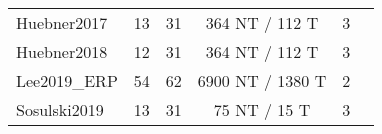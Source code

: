 \documentclass[twocolumn]{article}
\begin{document}
\begin{table*}[h]
\begin{tabularx}{\linewidth}{@{}Xrrcrl@{}}
		Huebner2017    & 13                         & 31          & 364 NT / 112 T           & 3                          &                                          \\
		Huebner2018    & 12                         & 31          & 364 NT / 112 T           & 3                          &                                          \\
		Lee2019\_ERP   & 54                         & 62          & 6900 NT / 1380 T         & 2                          &                                          \\
		Sosulski2019   & 13                         & 31          & 75 NT / 15 T             & 3                          &                                          \\ \bottomrule
	\end{tabularx}
\end{table*}
\end{document}
